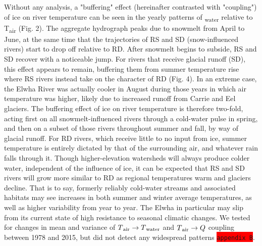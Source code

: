 \documentclass[notitlepage]{article}
\begin{document}
Without any analysis, a "buffering" effect (hereinafter contrasted with "coupling") of ice on river temperature can be seen in the yearly patterns of \textsubscript{water} relative to T\textsubscript{air} (Fig. 2). The aggregate hydrograph peaks due to snowmelt from April to June, at the same time that the trajectories of RS and SD (snow-influenced rivers) start to drop off relative to RD. After snowmelt begins to subside, RS and SD recover with a noticeable jump. For rivers that receive glacial runoff (SD), this effect appears to remain, buffering them from summer temperature rise where RS rivers instead take on the character of RD (Fig. 4). In an extreme case, the Elwha River was actually cooler in August during those years in which air temperature was higher, likely due to increased runoff from Carrie and Eel glaciers. The buffering effect of ice on river temperature is therefore two-fold, acting first on all snowmelt-influenced rivers through a cold-water pulse in spring, and then on a subset of those rivers throughout summer and fall, by way of glacial runoff. For RD rivers, which receive little to no input from ice, summer temperature is entirely dictated by that of the surrounding air, and whatever rain falls through it. Though higher-elevation watersheds will always produce colder water, independent of the influence of ice, it can be expected that RS and SD rivers will grow more similar to RD as regional temperatures warm and glaciers decline. That is to say, formerly reliably cold-water streams and associated habitats may see increases in both summer and winter average temperatures, as well as higher variability from year to year. The Elwha in particular may slip from its current state of high resistance to seasonal climatic changes. We tested for changes in mean and variance of $T\textsubscript{air}\rightarrow T\textsubscript{water}$ and $T\textsubscript{air}\rightarrow Q$ coupling between 1978 and 2015, but did not detect any widespread patterns \colorbox{red}{\lstinline{appendix B}}.
\end{document}
